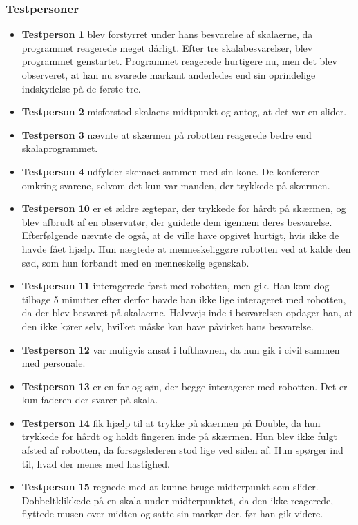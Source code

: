 \subsubsection{Testpersoner}
\begin{itemize}
\item \textbf{Testperson 1} blev forstyrret under hans besvarelse af skalaerne, da programmet reagerede meget dårligt. Efter tre skalabesvarelser, blev programmet genstartet. Programmet reagerede hurtigere nu, men det blev observeret, at han nu svarede markant anderledes end sin oprindelige indskydelse på de første tre. 
\item \textbf{Testperson 2}  misforstod skalaens midtpunkt og antog, at det var en slider. 
\item \textbf{Testperson 3} nævnte at skærmen på robotten reagerede bedre end skalaprogrammet.
\item \textbf{Testperson 4} udfylder skemaet sammen med sin kone. De konfererer omkring svarene, selvom det kun var manden, der trykkede på skærmen.
\item 	\textbf{Testperson 10} er et ældre ægtepar, der trykkede for hårdt på skærmen, og blev afbrudt af en observatør, der guidede dem igennem deres besvarelse. Efterfølgende nævnte de også, at de ville have opgivet hurtigt, hvis ikke de havde fået hjælp. Hun nægtede at menneskeliggøre robotten ved at kalde den sød, som hun forbandt med en menneskelig egenskab.
\item \textbf{Testperson 11} interagerede først med robotten, men gik. Han kom dog tilbage 5 minutter efter derfor havde han ikke lige interageret med robotten, da der blev besvaret på skalaerne. Halvvejs inde i besvarelsen opdager han, at den ikke kører selv, hvilket måske kan have påvirket hans besvarelse.
\item \textbf{Testperson 12} var muligvis ansat i lufthavnen, da hun gik i civil sammen med personale.
\item 	\textbf{Testperson 13} er en far og søn, der begge interagerer med robotten. Det er kun faderen der svarer på skala.
\item \textbf{Testperson 14} fik hjælp til at trykke på skærmen på Double, da hun trykkede for hårdt og holdt fingeren inde på skærmen. Hun blev ikke fulgt afsted af robotten, da forsøgslederen stod lige ved siden af. Hun spørger ind til, hvad der menes med hastighed.
\item \textbf{Testperson 15} regnede med at kunne bruge midterpunkt som slider. Dobbeltklikkede på en skala under midterpunktet, da den ikke reagerede, flyttede musen over midten og satte sin markør der, før han gik videre.

\end{itemize}
